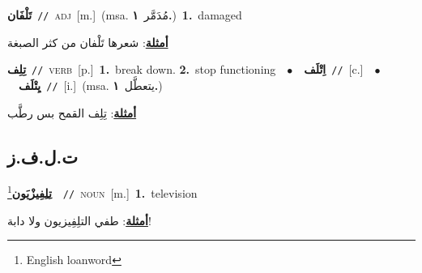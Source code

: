\documentclass[10pt,a4paper,twoside]{article} %
\begin{document}
\begin{multicols}{2}
{\setlength\topsep{0pt}\textbf{\foreignlanguage{arabic}{تَلْفَان}}\ {\color{gray}\texttt{//}\color{black}}\ \textsc{adj}\ [m.]\ \color{gray}(msa. \foreignlanguage{arabic}{مُدَمَّر}~\foreignlanguage{arabic}{\textbf{١.}})\color{black}\ \textbf{1.}~damaged\  \begin{flushright}\color{gray}\foreignlanguage{arabic}{\textbf{\underline{\foreignlanguage{arabic}{أمثلة}}}: شعرها تَلْفان من كثر الصبغة}\end{flushright}\color{black}} \vspace{2mm}

{\setlength\topsep{0pt}\textbf{\foreignlanguage{arabic}{تِلِف}}\ {\color{gray}\texttt{//}\color{black}}\ \textsc{verb}\ [p.]\ \textbf{1.}~break down.  \textbf{2.}~stop functioning\ \ $\bullet$\ \ \setlength\topsep{0pt}\textbf{\foreignlanguage{arabic}{اِتْلَف}}\ {\color{gray}\texttt{//}\color{black}}\ [c.]\ \ $\bullet$\ \ \setlength\topsep{0pt}\textbf{\foreignlanguage{arabic}{يِتْلَف}}\ {\color{gray}\texttt{//}\color{black}}\ [i.]\ \color{gray}(msa. \foreignlanguage{arabic}{يتعطَّل}~\foreignlanguage{arabic}{\textbf{١.}})\color{black}\  \begin{flushright}\color{gray}\foreignlanguage{arabic}{\textbf{\underline{\foreignlanguage{arabic}{أمثلة}}}: تِلِف القمح بس رطَّب}\end{flushright}\color{black}} \vspace{2mm}

\vspace{-3mm}
\subsection*{\color{blue}\foreignlanguage{arabic}{ت.ل.ف.ز}\color{blue}{ (ntws)}} 

{\setlength\topsep{0pt}\textbf{\foreignlanguage{arabic}{تِلِفِيزْيَون}}\footnote{English loanword}\ \ {\color{gray}\texttt{//}\color{black}}\ \textsc{noun}\ [m.]\ \textbf{1.}~television\  \begin{flushright}\color{gray}\foreignlanguage{arabic}{\textbf{\underline{\foreignlanguage{arabic}{أمثلة}}}: طفي التلِفِيزيون ولا دابة!}\end{flushright}\color{black}} \vspace{2mm}


\end{multicols}
\end{document}
